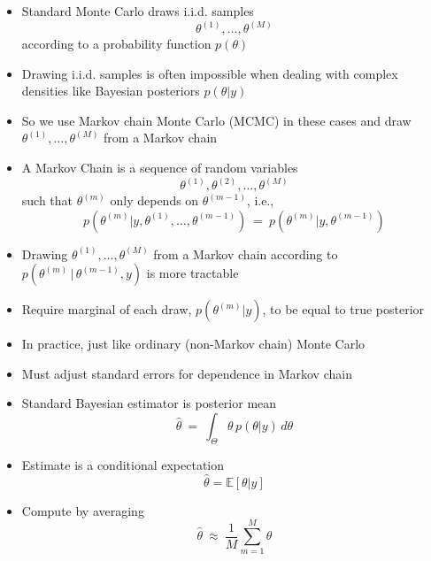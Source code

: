 \documentclass[10pt]{report}
\begin{document}

%
\begin{itemize}
\item Standard Monte Carlo draws i.i.d. samples
\[
\theta^{(1)}, \ldots, \theta^{(M)}
\]
according to a probability function $p(\theta)$
\item Drawing i.i.d. samples is often impossible when
  dealing with complex densities like Bayesian posteriors $p(\theta|y)$
\item So we use Markov chain Monte Carlo (MCMC) in these cases and
  draw $\theta^{(1)}, \ldots, \theta^{(M)}$ from a Markov chain
\end{itemize}

\begin{itemize}
\item A Markov Chain is a sequence of random variables 
\[
\theta^{(1)},
  \theta^{(2)}, \ldots, \theta^{(M)}
\]
such that $\theta^{(m)}$ only depends on $\theta^{(m-1)}$, i.e.,
\[
p(\theta^{(m)} | y, \theta^{(1)}, \ldots, \theta^{(m-1)})
\ = \
p(\theta^{(m)} | y, \theta^{(m-1)})
\]
\item Drawing $\theta^{(1)}, \ldots, \theta^{(M)}$ from a Markov chain
  according to \\ $p(\theta^{(m)} \, | \, \theta^{(m-1)}, y)$ is more tractable
\item Require marginal of each draw, $p(\theta^{(m)}|y)$,
  to be equal to true posterior
\end{itemize}

\begin{itemize}
\item In practice, just like ordinary (non-Markov chain) Monte Carlo
\item Must adjust standard errors for dependence in Markov chain
\end{itemize}

\begin{itemize}
\item Standard Bayesian estimator is posterior mean
\[
\hat{\theta}  \ =  \ \int_{\Theta} \theta \, p(\theta|y) \, d\theta
\]
\item Estimate is a conditional expectation
\[
\hat{\theta} = \mathbb{E}[\theta|y]
\]
\item Compute by averaging
\[
\hat{\theta} \ \approx \ \frac{1}{M} \sum_{m=1}^M \theta
\]
\end{itemize}
\end{document}
